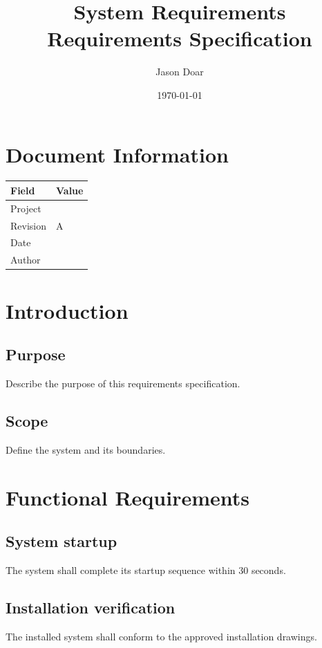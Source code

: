 \documentclass[11pt]{article}
\author{Jason Doar}
\date{\today}
\title{System Requirements\\\medskip
\large Requirements Specification}
\begin{document}
\maketitle
\setcounter{tocdepth}{2}
\tableofcontents

\section{Document Information}
\label{sec:org095f719}

\begin{center}
\begin{tabular}{ll}
Field & Value\\
\hline
Project & \\
Revision & A\\
Date & \\
Author & \\
\end{tabular}
\end{center}
\section{Introduction}
\label{sec:org89197fe}

\subsection{Purpose}
\label{sec:orgd9b5e4c}

Describe the purpose of this requirements specification.
\subsection{Scope}
\label{sec:org2057ab9}

Define the system and its boundaries.
\section{Functional Requirements}
\label{sec:org4e27f41}

\subsection{System startup}
\label{sec:org7ac9484}
The system shall complete its startup sequence within 30 seconds.
\subsection{Installation verification}
\label{sec:org2be1726}
The installed system shall conform to the approved installation drawings.
\end{document}
